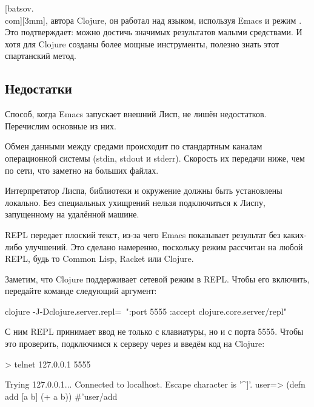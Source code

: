 [batsov.\\com][3mm], автора Clojure, он работал над языком, используя Emacs и режим . Это подтверждает: можно достичь значимых результатов малыми средствами. И хотя для Clojure созданы более мощные инструменты, полезно знать этот спартанский метод.

\subsection{Недостатки}

Способ, когда Emacs запускает внешний Лисп, не лишён недостатков. Перечислим основные из них.

Обмен данными между средами происходит по стандартным каналам операционной системы (stdin, stdout и stderr). Скорость их передачи ниже, чем по сети, что заметно на больших файлах.

Интерпретатор Лиспа, библиотеки и окружение должны быть установлены локально. Без специальных ухищрений нельзя подключиться к Лиспу, запущенному на удалённой машине.

REPL передает плоский текст, из-за чего Emacs показывает результат без каких-либо улучшений. Это сделано намеренно, поскольку режим  рассчитан на любой REPL, будь то Common Lisp, Racket или Clojure.

Заметим, что Clojure поддерживает сетевой режим в REPL. Чтобы его включить, передайте команде  следующий аргумент:


\begin{english}
  \begin{bash}
clojure -J-Dclojure.server.repl=\
  "{:port 5555 :accept clojure.core.server/repl}"
  \end{bash}
\end{english}

С ним REPL принимает ввод не только с клавиатуры, но и с порта 5555. Чтобы это проверить, подключимся к серверу через  и введём код на Clojure:

\begin{english}
  \begin{text}
> telnet 127.0.0.1 5555

Trying 127.0.0.1...
Connected to localhost.
Escape character is '^]'.
user=> (defn add [a b] (+ a b))
#'user/add
  \end{text}
\end{english}

